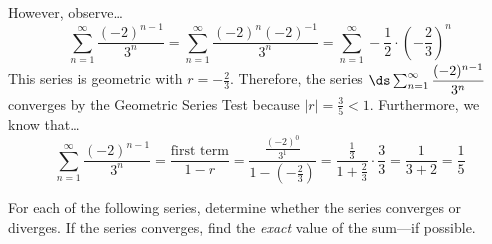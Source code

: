 \documentclass[12pt,letterpaper]{exam}
\begin{document}
\begin{questions}
{However, observe\dots
	\[
	\sum_{n=1}^\infty \dfrac{(-2)^{n-1}}{3^n}= \sum_{n=1}^\infty \dfrac{(-2)^n (-2)^{-1}}{3^n}= \sum_{n=1}^\infty -\dfrac{1}{2} \cdot \left( -\dfrac{2}{3} \right)^n
	\]
This series is geometric with $r= -\tfrac{2}{3}$. Therefore, the series $\ds\sum_{n=1}^\infty \dfrac{(-2)^{n-1}}{3^n}$ converges by the Geometric Series Test because $|r|= \tfrac{3}{5} < 1$. Furthermore, we know that\dots
	\[
	\sum_{n=1}^\infty \dfrac{(-2)^{n-1}}{3^n}= \dfrac{\text{first term}}{1 - r}= \dfrac{\tfrac{(-2)^0}{3^1}}{1 - \left(-\tfrac{2}{3} \right)}= \dfrac{\tfrac{1}{3}}{1 + \tfrac{2}{3}} \cdot \dfrac{3}{3}= \dfrac{1}{3 + 2}= \dfrac{1}{5}
	\]
}
	


\newpage
\question[16] For each of the following series, determine whether the series converges or diverges. If the series converges, find the \textit{exact} value of the sum---if possible. \par\vspace{0.3cm}
\end{questions}
\end{document}
